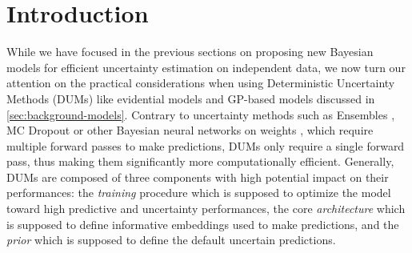 \section{Introduction}


While we have focused in the previous sections on proposing new Bayesian models for efficient uncertainty estimation on independent data, we now turn our attention on the practical considerations when using Deterministic Uncertainty Methods (DUMs) \citep{postels2022practicalitydum} like evidential models and GP-based models discussed in \cref*{sec:background-models}.  Contrary to uncertainty methods such as Ensembles \citep{ensembles}, MC Dropout \citep{dropout} or other Bayesian neural networks on weights \citep{bayesian-networks}, which require multiple forward passes to make predictions, DUMs only require a single forward pass, thus making them significantly more computationally efficient. 
Generally, DUMs are composed of three components with high potential impact on their performances: the \emph{training} procedure which is supposed to optimize the model toward high predictive and uncertainty performances, the core \emph{architecture} which is supposed to define informative embeddings used to make predictions, and the \emph{prior} which is supposed to define the default uncertain predictions. 

